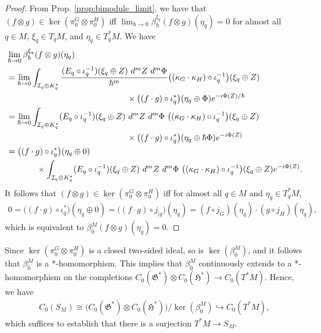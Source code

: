 \documentclass[sn-mathphys,Numbered]{sn-jnl}
\begin{document}
\begin{proof}
    From Prop. \ref{prop:bimodule_limit}, we have that $(f\otimes g)\in \ker(\pi^G_0\otimes \pi^H_0)$ iff $\lim_{\hbar\to 0}\beta^{\xi_q}_\hbar(f\otimes g)(\eta_q) = 0$ for almost all $q\in M$, $\xi_q\in T_qM$, and $\eta_q\in T^*_qM$.  We have
    \begin{align}
        &\lim_{\hbar\to 0} \beta^{\xi_q}_\hbar(f\otimes g)(\eta_q)\\
        &=\lim_{\hbar\to 0}\int_{\mathcal{I}_q\oplus K^*_q}\frac{(E_q\circ \iota_q^{-1})(\xi_q\oplus Z)\ d^{m}Z\  d^{m}\Phi}{\hbar^m} \big((\kappa_G\cdot\kappa_H)\circ\iota_q^{-1}\big)(\xi_q\oplus Z)\\
    & \hspace{2in} \times \big((f\cdot g)\circ\iota_q^*\big)(\eta_q\oplus \Phi)e^{-i\Phi(Z)/\hbar}\\
    &= \lim_{\hbar\to 0}\int_{\mathcal{I}_q\oplus K^*_q}(E_q\circ \iota_q^{-1})(\xi_q\oplus Z)\ d^{m}Z\ d^{m}\Phi\  \big((\kappa_G\cdot\kappa_H)\circ\iota_q^{-1}\big)(\xi_q\oplus Z)\\
    & \hspace{2in} \times \big((f\cdot g)\circ\iota_q^*\big)(\eta_q\oplus \hbar\Phi)e^{-i\Phi(Z)}\\
    &=\big((f\cdot g)\circ\iota_q^*\big)(\eta_q\oplus 0)\\
    &\hspace{.5in} \times \int_{\mathcal{I}_q\oplus K^*_q}(E_q\circ \iota_q^{-1})(\xi_q\oplus Z)\ d^{m}Z\ d^{m}\Phi\  \big((\kappa_G\cdot\kappa_H)\circ\iota_q^{-1}\big)(\xi_q\oplus Z)
   e^{-i\Phi(Z)}.
    \end{align}
It follows that $(f\otimes g)\in\ker(\pi_0^G\otimes\pi_0^H)$ iff for almost all $q\in M$ and $\eta_q\in T_q^*M$,
\begin{align}
\label{eq:kernel_beta}
    0 = \big((f\cdot g)\circ\iota^*_q\big)(\eta_q\oplus 0) = \big((f\cdot g)\circ j_{|q}\big)(\eta_q) = (f\circ j_G)(\eta_q)\cdot (g\circ j_H)(\eta_q),
\end{align}
which is equivalent to $\beta_0^M(f\otimes g)(\eta_q) = 0.$
\end{proof}\bigskip

Since $\ker(\pi_0^G\otimes\pi_0^H)$ is a closed two-sided ideal, so is $\ker(\beta_0^M)$, and it follows that $\beta_0^M$ is a *-homomorphism.  This implies that $\beta_0^M$ continuously extends to a *-homomorphism on the completions $C_0(\mathfrak{G}^*)\otimes C_0(\mathfrak{H}^*)\to C_0(T^*M)$.  Hence, we have
\begin{align}
    C_0(S_M) \cong \big(C_0(\mathfrak{G}^*)\otimes C_0(\mathfrak{H}^*)\big)/\ker(\beta_0^M)\hookrightarrow C_0(T^*M),
\end{align}
which suffices to establish that there is a surjection $T^*M\to S_M$.  
\end{document}
